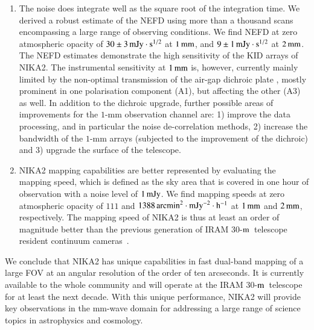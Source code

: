 \documentclass[traditionalabstract]{aa}
\newcommand{\trentemetre}{30-$\rm{m}$}
\newcommand{\lp}[1]{#1}
\begin{document}
{\begin{enumerate}
{    uncertainties surrounding the reference beam efficiencies, as given in
    Table~\ref{tab:nika2summary}}. The absolute
  calibration uncertainties are of $5\%,$ and the systematic
  calibration uncertainties evaluated at the IRAM
  \trentemetre\ reference Winter observing conditions are
  below $1\%$ in both channels.
   \vspace{1mm}
\item %
  The noise does integrate well as the square root of the integration time. We
  derived a robust estimate of the NEFD using more than a thousand scans
  encompassing a large range of observing conditions. We find NEFD at zero
  atmospheric opacity of $30 \pm 3\,\rm{mJy}\cdot s^{1/2}$ at $1\, \rm{mm}$, and
  $9 \pm 1\,\rm{mJy}\cdot s^{1/2}$ at $2\, \rm{mm}$.
  The NEFD estimates demonstrate the high sensitivity of
  the KID arrays of NIKA2. 
  The instrumental sensitivity at $1\,\rm{mm}$
  is, however, currently mainly limited by the non-optimal transmission of
  the air-gap dichroic plate%
  , mostly prominent in one polarisation component
  (A1), but affecting the other (A3) as well.
  In addition to the dichroic upgrade, further possible areas of
  improvements for the $1$-mm observation channel are: 1)
  improve the data processing, and in particular the noise
  de-correlation methods, 2) increase the bandwidth of the $1$-mm
  arrays (subjected to the improvement of the dichroic) and 3)
  upgrade the surface of the telescope.
   \vspace{1mm}
\item  NIKA2 mapping capabilities are better represented by evaluating the
  mapping speed, which is defined as the sky area that is covered in one
  hour of observation with a noise level of $1\,\rm{mJy}$. We find
  mapping speeds at zero atmospheric opacity of $111$ and
  $1388\, \rm{arcmin}^2 \cdot \rm{mJy}^{-2} \cdot \rm{h}^{-1}$ at
  $1\, \rm{mm}$ and  $2\, \rm{mm}$, respectively. The mapping speed of NIKA2 is thus at
  least an order of magnitude better than the previous generation of IRAM
 \trentemetre\ telescope resident continuum cameras~\citep{Catalano2014, Staguhn2011_GISMO, Kreysa1999}.
  
\end{enumerate}


We conclude that NIKA2 has unique capabilities in fast dual-band
mapping of a large FOV at an angular resolution of the order of ten arcseconds. {\lp It is currently available to the
whole community and will operate at the IRAM \trentemetre\ telescope
for at least the next decade.}
With this unique performance, NIKA2 will provide key observations in the mm-wave domain for addressing a large range of science topics in astrophysics and cosmology. 


}
\end{document}
